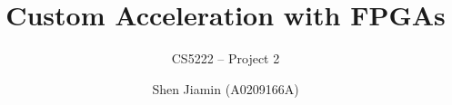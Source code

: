 \documentclass[screen,nonacm]{acmart}
\begin{document}
\title{
  Custom Acceleration with FPGAs
}
\subtitle{
  CS5222 -- Project 2
}

\author{Shen Jiamin (A0209166A)}

\maketitle



% 
% 

\clearpage
\appendix
\end{document}
